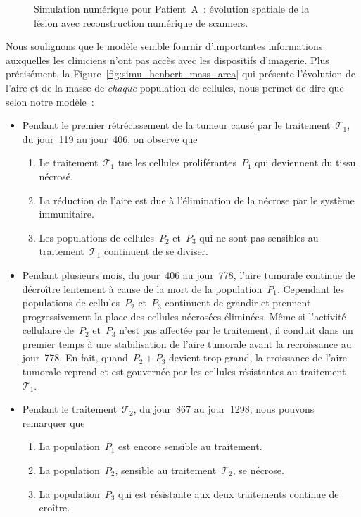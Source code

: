 \documentclass[11pt]{amsart}
\numberwithin{equation}{section}
\newcommand{\TI}{{\mathcal T_1}}
\newcommand{\TS}{{\mathcal T_2}}
\newcommand{\Nber}{Patient~A\xspace}
\begin{document}
\begin{figure}[h]
\caption{Simulation numérique pour \Nber~: évolution spatiale de la lésion avec reconstruction numérique de scanners.} \label{fig:simu_henbert_scan}
\end{figure}

Nous soulignons que le modèle semble fournir d'importantes informations auxquelles les cliniciens n'ont pas accès avec les dispositifs d'imagerie. Plus précisément, la  Figure~\ref{fig:simu_henbert_mass_area} qui présente l'évolution de l'aire et de la masse  de  \emph{chaque} population de cellules, nous permet de dire que selon notre modèle~: 
\begin{itemize}
\item Pendant le premier rétrécissement de la tumeur causé par le 
traitement~$\TI$, du jour~119 au jour~406, on observe que
\begin{enumerate}[label=\roman*)]
\item Le traitement~$\TI$ tue les cellules proliférantes~$P_1$ qui deviennent du tissu nécrosé. 
\item La réduction de l'aire est due à l'élimination de la nécrose par le système immunitaire. 
\item Les populations de cellules~$P_2$ et~$P_3$ qui ne sont pas sensibles au traitement~$\TI$ continuent de se diviser.
\end{enumerate}
\item Pendant plusieurs mois, du jour~406 au jour~778, l'aire tumorale continue de décroître lentement à cause de la mort de la population~$P_1$. Cependant les populations de cellules~$P_2$ et~$P_3$ continuent de grandir et prennent progressivement la place des cellules nécrosées éliminées.  Même si l'activité cellulaire de~$P_2$ et~$P_3$ n'est pas affectée par le traitement, il conduit dans un premier temps à une stabilisation de l'aire tumorale avant la recroissance au 
jour~778. En fait, quand~$P_2+P_3$ devient trop grand, la croissance de l'aire tumorale reprend et est gouvernée par les cellules résistantes au traitement~$\TI$.
\item Pendant le traitement~$\TS$, du jour~867 au jour~1298, nous pouvons remarquer que 
\begin{enumerate}[label=\roman*)]
\item La population~$P_1$ est encore sensible au traitement. 
\item La population~$P_2$, sensible au traitement~$\TS$, se nécrose.
\item La population~$P_3$ qui est résistante aux deux traitements continue de croître.
\end{enumerate}
\end{itemize}
\end{document}
